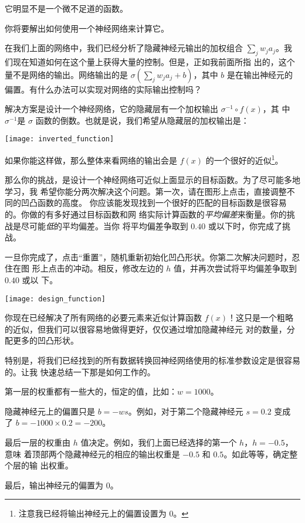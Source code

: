 它明显不是一个微不足道的函数。

你将要解出如何使用一个神经网络来计算它。

在我们上面的网络中，我们已经分析了隐藏神经元输出的加权组合
$\sum_j w_j a_j$。我们现在知道如何在这个量上获得大量的控制。但是，正如我前面所指
出的，这个量不是网络的输出。网络输出的是 $\sigma(\sum_j w_j a_j + b)$，其中 $b$
是在输出神经元的偏置。有什么办法可以实现对网络的实际输出控制吗？

解决方案是设计一个神经网络，它的隐藏层有一个加权输出 $\sigma^{-1} \circ f(x)$，其
中 $\sigma^{-1}$是 $\sigma$ 函数的倒数。也就是说，我们希望从隐藏层的加权输出是：
\begin{center}
  \texttt{[image: inverted\_function]}
\end{center}

如果你能这样做，那么整体来看网络的输出会是 $f(x)$ 的一个很好的近似\footnote{
  注意我已经将输出神经元上的偏置设置为 $0$。}。

那么你的挑战，是设计一个神经网络可近似上面显示的目标函数。为了尽可能多地学习，我
希望你能分两次解决这个问题。第一次，请在图形上点击，直接调整不同的凹凸函数的高度。
你应该能发现找到一个很好的匹配的目标函数是很容易的。你做的有多好通过目标函数和网
络实际计算函数的\emph{平均偏差}来衡量。你的挑战是尽可能\emph{低}的平均偏差。当你
将平均偏差争取到 $0.40$ 或以下时，你完成了挑战。

一旦你完成了，点击“重置”，随机重新初始化凹凸形状。你第二次解决问题时，忍住在图
形上点击的冲动。相反，修改左边的 $h$ 值，并再次尝试将平均偏差争取到 $0.40$ 或以
下。
\begin{center}
  \texttt{[image: design\_function]}
\end{center}

你现在已经解决了所有网络的必要元素来近似计算函数
$f(x)$！这只是一个粗略的近似，但我们可以很容易地做得更好，仅仅通过增加隐藏神经元
对的数量，分配更多的凹凸形状。

特别是，将我们已经找到的所有数据转换回神经网络使用的标准参数设定是很容易的。让我
快速总结一下那是如何工作的。

第一层的权重都有一些大的，恒定的值，比如：$w = 1000$。

隐藏神经元上的偏置只是 $b = -w s$。例如，对于第二个隐藏神经元 $s = 0.2$ 变成
了 $b = -1000 \times 0.2 = -200$。

最后一层的权重由 $h$ 值决定。例如，我们上面已经选择的第一个 $h$，$h = -0.5$，意味
着顶部两个隐藏神经元的相应的输出权重是 $-0.5$ 和 $0.5$。如此等等，确定整个层的输
出权重。

最后，输出神经元的偏置为 $0$。

